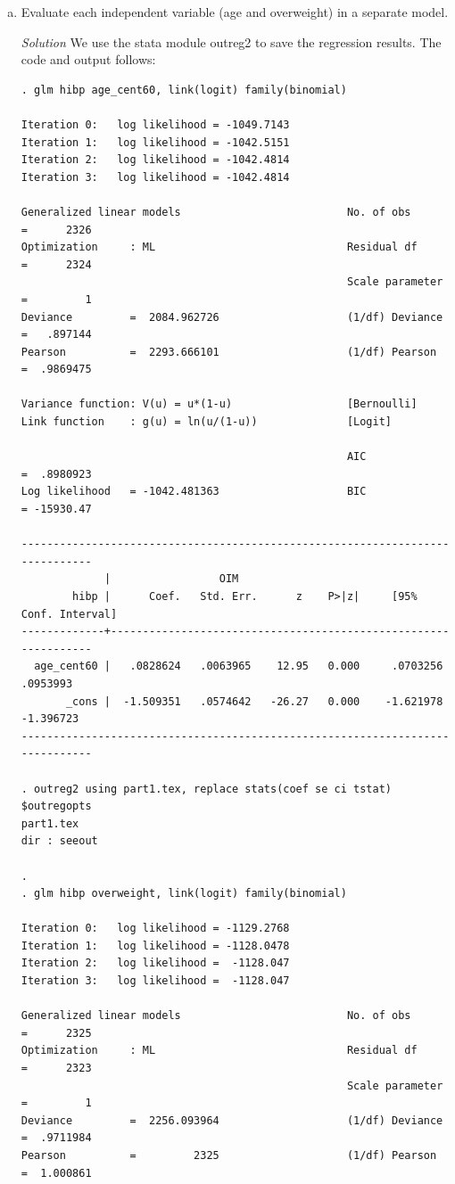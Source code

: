 \documentclass{article}
\begin{document}
 \begin{enumerate}[a.]
     \item  Evaluate each independent variable (age and overweight) in a separate model.
     
     \textit{Solution} We use the stata module outreg2 to save the regression results. The code and output follows:
     
\begin{verbatim}
. glm hibp age_cent60, link(logit) family(binomial)

Iteration 0:   log likelihood = -1049.7143  
Iteration 1:   log likelihood = -1042.5151  
Iteration 2:   log likelihood = -1042.4814  
Iteration 3:   log likelihood = -1042.4814  

Generalized linear models                          No. of obs      =      2326
Optimization     : ML                              Residual df     =      2324
                                                   Scale parameter =         1
Deviance         =  2084.962726                    (1/df) Deviance =   .897144
Pearson          =  2293.666101                    (1/df) Pearson  =  .9869475

Variance function: V(u) = u*(1-u)                  [Bernoulli]
Link function    : g(u) = ln(u/(1-u))              [Logit]

                                                   AIC             =  .8980923
Log likelihood   = -1042.481363                    BIC             = -15930.47

------------------------------------------------------------------------------
             |                 OIM
        hibp |      Coef.   Std. Err.      z    P>|z|     [95% Conf. Interval]
-------------+----------------------------------------------------------------
  age_cent60 |   .0828624   .0063965    12.95   0.000     .0703256    .0953993
       _cons |  -1.509351   .0574642   -26.27   0.000    -1.621978   -1.396723
------------------------------------------------------------------------------

. outreg2 using part1.tex, replace stats(coef se ci tstat) $outregopts
part1.tex
dir : seeout

. 
. glm hibp overweight, link(logit) family(binomial)

Iteration 0:   log likelihood = -1129.2768  
Iteration 1:   log likelihood = -1128.0478  
Iteration 2:   log likelihood =  -1128.047  
Iteration 3:   log likelihood =  -1128.047  

Generalized linear models                          No. of obs      =      2325
Optimization     : ML                              Residual df     =      2323
                                                   Scale parameter =         1
Deviance         =  2256.093964                    (1/df) Deviance =  .9711984
Pearson          =         2325                    (1/df) Pearson  =  1.000861


\end{verbatim}
\end{enumerate}
\end{document}
